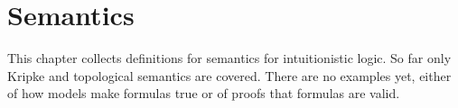 \documentclass[../../../include/open-logic-chapter]{subfiles}
\begin{document}
\chapter{Semantics}

\begin{editorial}
  This chapter collects definitions for semantics for intuitionistic
  logic. So far only Kripke and topological semantics are
  covered. There are no examples yet, either of how models make
  formulas true or of proofs that formulas are valid.
\end{editorial}


\OLEndChapterHook
\end{document}
